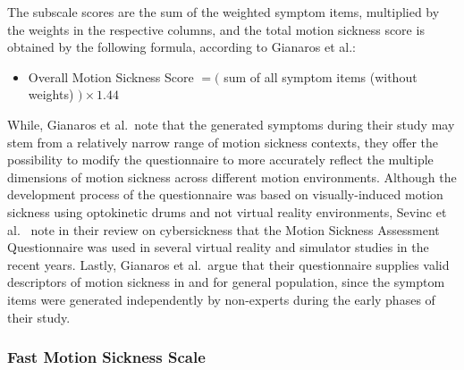 The subscale scores are the sum of the weighted symptom items, multiplied by the weights in the respective columns, and
the total motion sickness score is obtained by the following formula, according to Gianaros et al.:
\begin{itemize}
    \item Overall Motion Sickness Score $= ($ sum of all symptom items (without weights) $) \times 1.44$
\end{itemize}
While, Gianaros et al.\ note that the generated symptoms during their study may stem from a relatively narrow range
of motion sickness contexts, they offer the possibility to modify the questionnaire to more accurately reflect the
multiple dimensions of motion sickness across different motion environments.
Although the development process of the questionnaire was based on visually-induced motion sickness using optokinetic
drums and not virtual reality environments, Sevinc et al.~\cite{Sevinc2020} note in their review on cybersickness
that the Motion Sickness Assessment Questionnaire was used in several virtual reality and simulator studies in the
recent years.
Lastly, Gianaros et al.\ argue that their questionnaire supplies valid descriptors of motion sickness in and for
general population, since the symptom items were generated independently by non-experts during the early phases of
their study.

\subsubsection{Fast Motion Sickness Scale}\label{subsubsec:fast-motion-sickness-scale}

